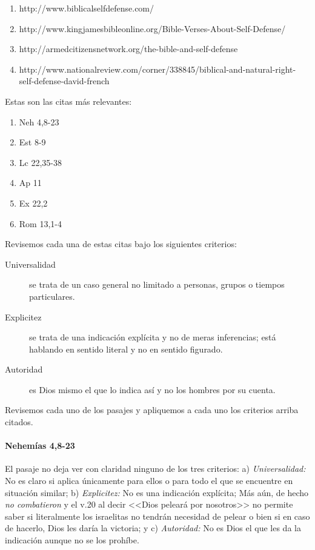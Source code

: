 \documentclass{article}
\begin{document}
\begin{enumerate}
\item http://www.biblicalselfdefense.com/
\item http://www.kingjamesbibleonline.org/Bible-Verses-About-Self-Defense/
\item http://armedcitizensnetwork.org/the-bible-and-self-defense
\item http://www.nationalreview.com/corner/338845/biblical-and-natural-right-self-defense-david-french
\end{enumerate}

\noindent
Estas son las citas m\'as relevantes:

\begin{enumerate}
\item Neh 4,8-23
\item Est 8-9
\item Lc 22,35-38
\item Ap 11
\item Ex 22,2
\item Rom 13,1-4
\end{enumerate}

\noindent
Revisemos cada una de estas citas bajo los siguientes criterios:

\begin{description}
\item[Universalidad] se trata de un caso general no limitado a personas, grupos o tiempos particulares.
\item[Explicitez] se trata de una indicaci\'{o}n expl\'{i}cita y no de meras inferencias; est\'a hablando en sentido literal y no en sentido figurado.
\item[Autoridad] es Dios mismo el que lo indica as\'{i} y no los hombres por su cuenta.
\end{description}

\noindent
Revisemos cada uno de los pasajes y apliquemos a cada uno los criterios arriba citados.

\paragraph{Nehem\'{i}as 4,8-23}

El pasaje no deja ver con claridad ninguno de los tres criterios: a) \emph{Universalidad:} No es claro si aplica \'unicamente para ellos o para todo el que se encuentre en situaci\'on similar; b) \emph{Explicitez:} No es una indicaci\'on expl\'{i}cita; M\'as a\'un, de hecho \emph{no combatieron} y el v.20 al decir <<Dios pelear\'a por nosotros>> no permite saber si literalmente los israelitas no tendr\'an necesidad de pelear o bien si en caso de hacerlo, Dios les dar\'{i}a la victoria; y c) \emph{Autoridad:} No es Dios el que les da la indicaci\'on aunque no se los proh\'{i}be.
\end{document}
